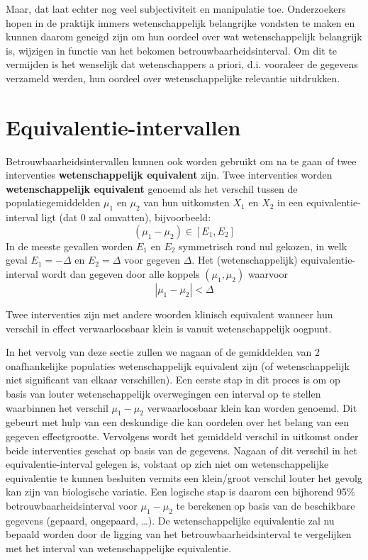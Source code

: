 \documentclass[
  12pt,dutch,coursenotes]{book}
\theoremstyle{definition}
\theoremstyle{definition}
\theoremstyle{definition}
\theoremstyle{remark}
\begin{document}
Maar, dat laat echter nog veel subjectiviteit en manipulatie toe. Onderzoekers hopen in de praktijk immers wetenschappelijk belangrijke vondsten te maken en kunnen daarom geneigd zijn om hun oordeel over wat wetenschappelijk belangrijk is, wijzigen in functie van het bekomen betrouwbaarheidsinterval. Om dit te vermijden is het wenselijk dat wetenschappers a priori, d.i. vooraleer de gegevens verzameld werden, hun oordeel over wetenschappelijke relevantie uitdrukken.

\hypertarget{equivalentie-intervallen}{%
\section{Equivalentie-intervallen}\label{equivalentie-intervallen}}

Betrouwbaarheidsintervallen kunnen ook worden gebruikt om na te gaan of twee interventies \textbf{wetenschappelijk equivalent} zijn.
Twee interventies worden \textbf{wetenschappelijk equivalent} genoemd als het verschil tussen de populatiegemiddelden
\(\mu_1\) en \(\mu_2\) van hun uitkomsten \(X_1\) en \(X_2\) in een
equivalentie-interval ligt (dat 0 zal omvatten), bijvoorbeeld:
\begin{equation*}
(\mu_1 - \mu_2) \in [E_1, E_2]
\end{equation*}
In de meeste gevallen worden \(E_1\) en \(E_2\) symmetrisch rond nul gekozen, in
welk geval \(E_1=-\Delta\) en \(E_2=\Delta\) voor gegeven \(\Delta\). Het
(wetenschappelijk) equivalentie-interval wordt dan gegeven door alle koppels \((\mu_1,\mu_2)\) waarvoor
\begin{equation*}
|\mu_1 - \mu_2| < \Delta
\end{equation*}

Twee interventies zijn met andere woorden klinisch equivalent
wanneer hun verschil in effect verwaarloosbaar klein is vanuit wetenschappelijk
oogpunt.

In het vervolg van deze sectie zullen we nagaan of de gemiddelden van 2 onafhankelijke
populaties wetenschappelijk equivalent zijn (of wetenschappelijk niet significant van elkaar
verschillen). Een eerste stap in dit proces is om op basis van louter
wetenschappelijk overwegingen een interval op te stellen waarbinnen het verschil \(\mu_1-\mu_2\) verwaarloosbaar klein kan worden genoemd. Dit gebeurt met hulp van een deskundige die kan oordelen over het belang van een gegeven
effectgrootte. Vervolgens wordt het gemiddeld verschil in uitkomst onder
beide interventies geschat op basis van de gegevens. Nagaan of dit verschil
in het equivalentie-interval gelegen is, volstaat op zich niet om wetenschappelijke
equivalentie te kunnen besluiten vermits een klein/groot verschil louter
het gevolg kan zijn van biologische variatie. Een logische stap is daarom
een bijhorend 95\% betrouwbaarheidsinterval voor \(\mu_1 - \mu_2\) te berekenen op basis van de beschikbare gegevens (gepaard, ongepaard, \ldots). De wetenschappelijke equivalentie zal nu bepaald worden door de ligging van het
betrouwbaarheidsinterval te vergelijken met het interval van wetenschappelijke
equivalentie.
\end{document}
